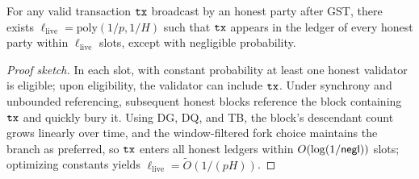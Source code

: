 \begin{theorem}
\label{thm:ideal-liveness}
For any valid transaction $\mathtt{tx}$ broadcast by an honest party after GST, there exists $\ell_{\mathrm{live}}=\mathrm{poly}(1/p,1/H)$ such that $\mathtt{tx}$ appears in the ledger of every honest party within $\ell_{\mathrm{live}}$ slots, except with negligible probability.
\end{theorem}
\begin{proof}[Proof sketch]
In each slot, with constant probability at least one honest validator is eligible; upon eligibility, the validator can include $\mathtt{tx}$. Under synchrony and unbounded referencing, subsequent honest blocks reference the block containing $\mathtt{tx}$ and quickly bury it. Using DG, DQ, and TB, the block's descendant count grows linearly over time, and the window-filtered fork choice maintains the branch as preferred, so $\mathtt{tx}$ enters all honest ledgers within $O(\log(1/\mathsf{negl}))$ slots; optimizing constants yields $\ell_{\mathrm{live}}=\tilde{O}(1/(pH))$.
\end{proof}




